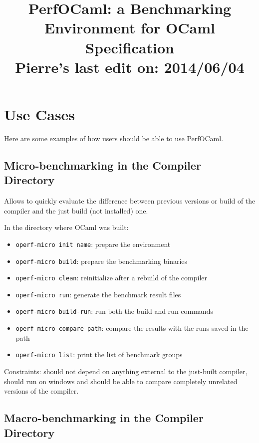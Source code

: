 \documentclass[11pt,a4paper]{article}
\begin{document}
\title{PerfOCaml: a Benchmarking Environment for OCaml\\Specification\\Pierre's last edit on: 2014/06/04}

\maketitle
\tableofcontents
\section{Use Cases}

Here are some examples of how users should be able to use PerfOCaml.

\subsection{Micro-benchmarking in the Compiler Directory}

Allows to quickly evaluate the difference between previous versions or
build of the compiler and the just build (not installed) one.

In the directory where OCaml was built:
\begin{itemize}
\item {\tt operf-micro init name}: prepare the environment
\item {\tt operf-micro build}: prepare the benchmarking binaries
\item {\tt operf-micro clean}: reinitialize after a rebuild of the compiler
\item {\tt operf-micro run}: generate the benchmark result files
\item {\tt operf-micro build-run}: run both the build and run commands
\item {\tt operf-micro compare path}: compare the results with the runs saved in the path
\item {\tt operf-micro list}: print the list of benchmark groups
\end{itemize}

Constraints: should not depend on anything external to the just-built
compiler, should run on windows and should be able to compare
completely unrelated versions of the compiler.

\subsection{Macro-benchmarking in the Compiler Directory}
\end{document}

